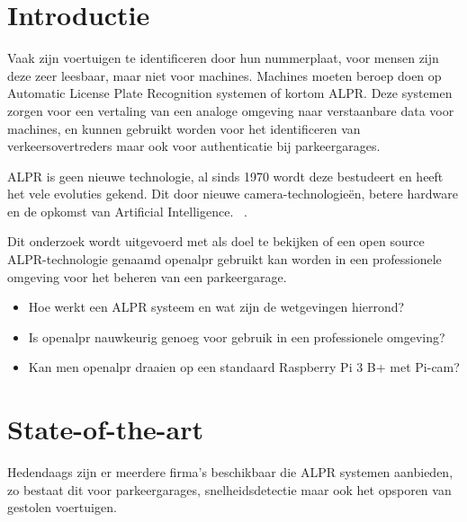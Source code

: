 
\section{Introductie} %
\label{sec:introductie}

Vaak zijn voertuigen te identificeren door hun nummerplaat, voor mensen zijn deze zeer leesbaar, maar niet voor machines. Machines moeten beroep doen op Automatic License Plate Recognition systemen of kortom ALPR. Deze systemen zorgen voor een vertaling van een analoge omgeving naar verstaanbare data voor machines, en kunnen gebruikt worden voor het identificeren van verkeersovertreders maar ook voor authenticatie bij parkeergarages.

ALPR is geen nieuwe technologie, al sinds 1970 wordt deze bestudeert en heeft het vele evoluties gekend. Dit door nieuwe camera-technologieën, betere hardware en de opkomst van Artificial Intelligence. ~\autocite{han2015real}.

Dit onderzoek wordt uitgevoerd met als doel te bekijken of een open source ALPR-technologie genaamd openalpr gebruikt kan worden in een professionele omgeving voor het beheren van een parkeergarage.

\begin{itemize}
  \item Hoe werkt een ALPR systeem en wat zijn de wetgevingen hierrond?
  \item Is openalpr nauwkeurig genoeg voor gebruik in een professionele omgeving?
  \item Kan men openalpr draaien op een standaard Raspberry Pi 3 B+ met Pi-cam?
\end{itemize}


\section{State-of-the-art}
\label{sec:state-of-the-art}

Hedendaags zijn er meerdere firma's beschikbaar die ALPR systemen aanbieden, zo bestaat dit voor parkeergarages, snelheidsdetectie maar ook het opsporen van gestolen voertuigen.

